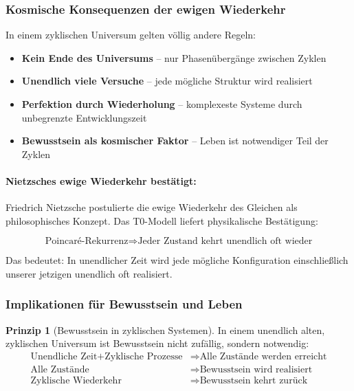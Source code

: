 \documentclass[12pt,a4paper]{article}
\theoremstyle{definition}
\newtheorem{principle}{Prinzip}
\begin{document}
	\subsubsection{Kosmische Konsequenzen der ewigen Wiederkehr}
	
	\begin{important}
		In einem zyklischen Universum gelten völlig andere Regeln:
		\begin{itemize}
			\item \textbf{Kein Ende des Universums} -- nur Phasenübergänge zwischen Zyklen
			\item \textbf{Unendlich viele Versuche} -- jede mögliche Struktur wird realisiert
			\item \textbf{Perfektion durch Wiederholung} -- komplexeste Systeme durch unbegrenzte Entwicklungszeit
			\item \textbf{Bewusstsein als kosmischer Faktor} -- Leben ist notwendiger Teil der Zyklen
		\end{itemize}
	\end{important}
	
	\paragraph{Nietzsches ewige Wiederkehr bestätigt:}
	Friedrich Nietzsche postulierte die ewige Wiederkehr des Gleichen als philosophisches Konzept. Das T0-Modell liefert physikalische Bestätigung:
	
	\begin{equation}
		\text{Poincaré-Rekurrenz} \Rightarrow \text{Jeder Zustand kehrt unendlich oft wieder}
	\end{equation}
	
	Das bedeutet: In unendlicher Zeit wird jede mögliche Konfiguration einschließlich unserer jetzigen unendlich oft realisiert.
	
	\subsubsection{Implikationen für Bewusstsein und Leben}
	
	\begin{principle}[Bewusstsein in zyklischen Systemen]
		In einem unendlich alten, zyklischen Universum ist Bewusstsein nicht zufällig, sondern notwendig:
		\begin{align}
			\text{Unendliche Zeit} + \text{Zyklische Prozesse} &\Rightarrow \text{Alle Zustände werden erreicht} \\
			\text{Alle Zustände} &\Rightarrow \text{Bewusstsein wird realisiert} \\
			\text{Zyklische Wiederkehr} &\Rightarrow \text{Bewusstsein kehrt zurück}
		\end{align}
	\end{principle}
	
\end{document}
